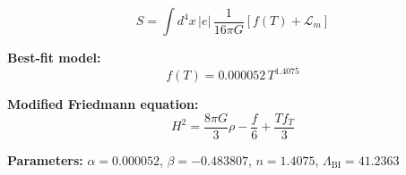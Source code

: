 
\begin{equation}
  S = \int d^4x \, |e| \, \frac{1}{16\pi G} \left[ f(T) + \mathcal{L}_m \right]
\end{equation}

\textbf{Best-fit model:}
\begin{equation}
  f(T) = 0.000052 \, T^{1.4075}
\end{equation}

\textbf{Modified Friedmann equation:}
\begin{equation}
  H^2 = \frac{8\pi G}{3} \rho - \frac{f}{6} + \frac{T f_T}{3}
\end{equation}

\textbf{Parameters:}
$\alpha = 0.000052$, \quad
$\beta = -0.483807$, \quad
$n = 1.4075$, \quad
$\Lambda_{\text{BI}} = 41.2363$